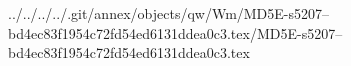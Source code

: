 ../../../../.git/annex/objects/qw/Wm/MD5E-s5207--bd4ec83f1954c72fd54ed6131ddea0c3.tex/MD5E-s5207--bd4ec83f1954c72fd54ed6131ddea0c3.tex